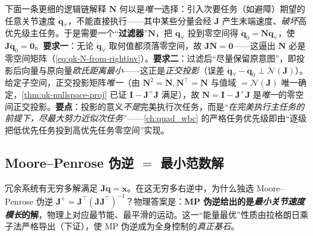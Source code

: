 \begin{note}\label{note:qk-proj-filter}
下面一条更细的逻辑链解释 $\mathbf{N}$ 何以是\emph{唯一}选择\cite{yu2021quadruped}：引入次要任务（如避障）期望的任意关节速度 $\dot{\boldsymbol{q}}_{\forall}$，不能直接执行——其中某些分量会经 $\mathbf{J}$ 产生末端速度、\emph{破坏}高优先级主任务。于是需要一个“\textbf{过滤器}”$\mathbf{N}$，把 $\dot{\boldsymbol{q}}_{\forall}$ 投到零空间得 $\dot{\boldsymbol{q}}_0=\mathbf{N}\dot{\boldsymbol{q}}_{\forall}$，使 $\mathbf{J}\dot{\boldsymbol{q}}_0=\mathbf{0}$。\textbf{要求一}：无论 $\dot{\boldsymbol{q}}_{\forall}$ 取何值都须落零空间，故 $\mathbf{J}\mathbf{N}=\mathbf{0}$——这逼出 $\mathbf{N}$ 必是零空间矩阵（\cref{eq:qk-N-from-rightinv}）。\textbf{要求二}：过滤后“尽量保留原意图”，即投影后向量与原向量\emph{欧氏距离最小}——这正是\emph{正交投影}（误差 $\dot{\boldsymbol{q}}_{\forall}-\dot{\boldsymbol{q}}_0\perp\mathcal{N}(\mathbf{J})$）。给定子空间，正交投影矩阵\emph{唯一}（由 $\mathbf{N}^2=\mathbf{N},\mathbf{N}^\top=\mathbf{N}$ 与值域 $=\mathcal{N}(\mathbf{J})$ 唯一确定，\cref{thm:qk-nullspace-proj} 已证 $\mathbf{I}-\mathbf{J}^{+}\mathbf{J}$ 满足），故 $\mathbf{N}=\mathbf{I}-\mathbf{J}^{+}\mathbf{J}$ 是\emph{唯一}的零空间正交投影。\textbf{要点}：投影的意义\emph{不是}完美执行次任务，而是“\emph{在完美执行主任务的前提下，尽最大努力近似次任务}”——\cref{ch:quad_wbc} 的严格任务优先级即由“逐级把低优先任务投到高优先任务零空间”实现。
\end{note}

\subsection{Moore--Penrose 伪逆 \texorpdfstring{$=$}{=} 最小范数解}
\label{subsec:qk-mp-pinv}

\begin{insight}[K8：MP 伪逆 $=$ 能量最优（全身控制真正基石）]\label{ins:qk-mp-energy}
冗余系统有无穷多解满足 $\mathbf{J}\dot{\boldsymbol{q}}=\dot{\boldsymbol{x}}$。在这无穷多右逆中，为什么独选 Moore--Penrose 伪逆 $\mathbf{J}^{+}=\mathbf{J}^\top(\mathbf{J}\mathbf{J}^\top)^{-1}$？物理答案是：\textbf{MP 伪逆给出的是\emph{最小关节速度模长}的解}，物理上对应最节能、最平滑的运动。这一“能量最优”性质由拉格朗日乘子法严格导出（下证），使 MP 伪逆成为全身控制的\emph{真正基石}。
\end{insight}

